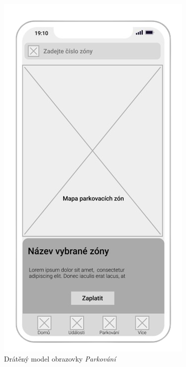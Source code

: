 \begin{minipage}[t]{0.45\textwidth}
  \begin{figure}[H]
    \centering
    \includegraphics[width=.7\textwidth]{parking_wireframe.png}
    \caption{Drátěný model obrazovky \textit{Parkování}}
    \label{fig:wireframe3}
  \end{figure}
  \begin{figure}[H]
    \centering

\end{figure}
\end{minipage}
